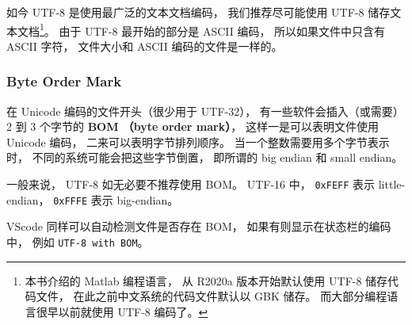 如今 UTF-8 是使用最广泛的文本文档编码， 我们推荐尽可能使用 UTF-8 储存文本文档\footnote{本书介绍的 Matlab 编程语言， 从 R2020a 版本开始默认使用 UTF-8 储存代码文件， 在此之前中文系统的代码文件默认以 GBK 储存。 而大部分编程语言很早以前就使用 UTF-8 编码了。}。 由于 UTF-8 最开始的部分是 ASCII 编码， 所以如果文件中只含有 ASCII 字符， 文件大小和 ASCII 编码的文件是一样的。

\subsubsection{Byte Order Mark}
在 Unicode 编码的文件开头（很少用于 UTF-32）， 有一些软件会插入（或需要） 2 到 3 个字节的 \textbf{BOM （byte order mark）}， 这样一是可以表明文件使用 Unicode 编码， 二来可以表明字节排列顺序。 当一个整数需要用多个字节表示时， 不同的系统可能会把这些字节倒置， 即所谓的 big endian 和 small endian。

一般来说， UTF-8 如无必要不推荐使用 BOM。 UTF-16 中， \verb|0xFEFF| 表示 little-endian， \verb|0xFFFE| 表示 big-endian。

VScode 同样可以自动检测文件是否存在 BOM， 如果有则显示在状态栏的编码中， 例如 \verb|UTF-8 with BOM|。
